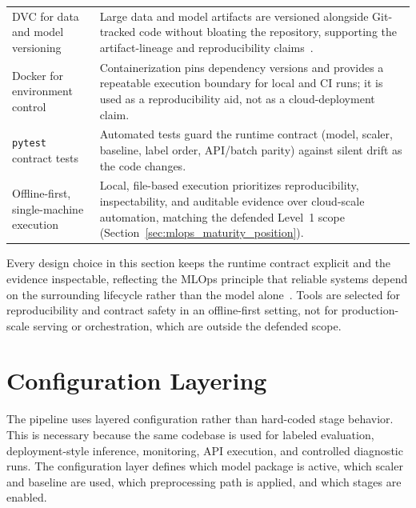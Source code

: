 \begin{table}[htbp]
\begin{tabularx}{\textwidth}{p{3.2cm} X}
DVC for data and model versioning
& Large data and model artifacts are versioned alongside Git-tracked code without bloating the repository, supporting the artifact-lineage and reproducibility claims~\cite{kuprieiev2023dvc}. \\

Docker for environment control
& Containerization pins dependency versions and provides a repeatable execution boundary for local and CI runs; it is used as a reproducibility aid, not as a cloud-deployment claim. \\

\texttt{pytest} contract tests
& Automated tests guard the runtime contract (model, scaler, baseline, label order, API/batch parity) against silent drift as the code changes. \\

Offline-first, single-machine execution
& Local, file-based execution prioritizes reproducibility, inspectability, and auditable evidence over cloud-scale automation, matching the defended Level~1 scope (Section~\ref{sec:mlops_maturity_position}). \\
\bottomrule
\end{tabularx}
\renewcommand{\arraystretch}{1.0}
\end{table}

Every design choice in this section keeps the runtime contract explicit and the evidence inspectable, reflecting the MLOps principle that reliable systems depend on the surrounding lifecycle rather than the model alone~\cite{amershi2019mlops,kreuzberger2023mlops,sculley2015debt}. Tools are selected for reproducibility and contract safety in an offline-first setting, not for production-scale serving or orchestration, which are outside the defended scope.

\section{Configuration Layering}
\label{sec:configuration_layering}

The pipeline uses layered configuration rather than hard-coded stage behavior. This is necessary because the same codebase is used for labeled evaluation, deployment-style inference, monitoring, API execution, and controlled diagnostic runs. The configuration layer defines which model package is active, which scaler and baseline are used, which preprocessing path is applied, and which stages are enabled.


